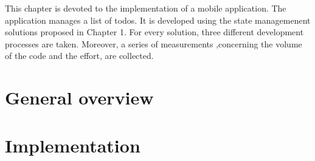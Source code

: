 This chapter is devoted to the implementation of a mobile application. The application manages a list of todos. It is developed using the state managemenent solutions proposed in Chapter 1. For every solution, three different development processes are taken. Moreover, a series of measurements ,concerning the volume of the code and the effort, are collected.
\section{General overview}
\label{sec:general_overview}


\section{Implementation}
\label{sec:implementation}

